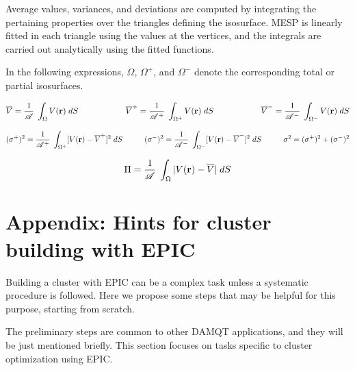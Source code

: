 \documentclass[10pt]{article}
\begin{document}
Average values, variances, and deviations are computed by integrating the pertaining properties over the triangles defining the isosurface. MESP is linearly fitted in each triangle using the values at the vertices, and the integrals are carried out analytically using the fitted functions.

In the following expressions, $\Omega$, $\Omega^+$, and $\Omega^-$ denote the corresponding total or partial isosurfaces.


$$
\overline{V} = \frac{1}{\mathscr{A}} \; \int_\Omega V({\bf r}) \; dS
\hspace*{2cm}
\overline{V}^+ = \frac{1}{\mathscr{A}^+} \; \int_{\Omega^+} V({\bf r}) \; dS
\hspace*{2cm}
\overline{V}^- = \frac{1}{\mathscr{A}^-} \; \int_{\Omega^-} V({\bf r}) \; dS
$$

$$
(\sigma^+)^2 = \frac{1}{\mathscr{A}^+} \; \int_{\Omega^+} [V({\bf r}) - \overline{V}^+]^2 \; dS
\hspace*{1cm}
(\sigma^-)^2 = \frac{1}{\mathscr{A}^-} \; \int_{\Omega^-} [V({\bf r}) - \overline{V}^-]^2 \; dS
\hspace*{1cm}
\sigma^2 = (\sigma^+)^2 + (\sigma^-)^2
$$

$$
\Pi = \frac{1}{\mathscr{A}} \; \int_\Omega | V({\bf r}) - \overline{V}| \; dS
$$


\section{Appendix: Hints for cluster building with EPIC\label{A6}}

Building a cluster with EPIC can be a complex task unless a systematic
procedure is followed. Here we propose some steps that may be helpful 
for this purpose, starting from scratch.

The preliminary steps are common to other DAMQT applications, and they will be
just mentioned briefly. This section focuses on tasks specific to cluster optimization using EPIC.
\end{document}
